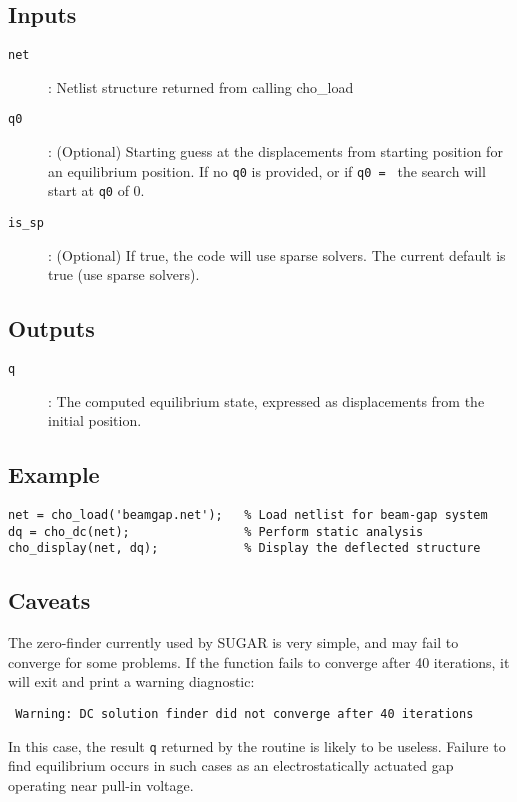 \subsection*{Inputs}

\begin{description}
\item[\texttt{net}]: 
  Netlist structure returned from calling cho\_load
\item[\texttt{q0}]: 
  (Optional) Starting guess at the displacements from starting position
  for an equilibrium position.
  If no \texttt{q0} is provided, or if \texttt{q0 = {}} 
  the search will start at \texttt{q0} of 0.
\item[\texttt{is\_sp}]: 
  (Optional) If true, the code will use sparse solvers.
  The current default is true (use sparse solvers).
\end{description}

\subsection*{Outputs}

\begin{description}
\item[\texttt{q}]: The computed equilibrium state, expressed as
  displacements from the initial position.
\end{description}

\subsection*{Example}

\begin{verbatim}
net = cho_load('beamgap.net');   % Load netlist for beam-gap system
dq = cho_dc(net);                % Perform static analysis
cho_display(net, dq);            % Display the deflected structure
\end{verbatim}

\subsection*{Caveats}

The zero-finder currently used by SUGAR is very simple, and may
fail to converge for some problems.  If the function fails to converge
after 40 iterations, it will exit and print a warning diagnostic:
\begin{verbatim}
 Warning: DC solution finder did not converge after 40 iterations
\end{verbatim}
In this case, the result \texttt{q} returned by the routine is likely
to be useless.  Failure to find equilibrium occurs in such cases as
an electrostatically actuated gap operating near pull-in voltage.

